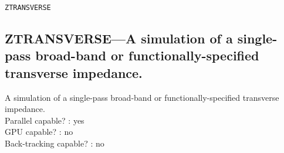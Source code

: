 \vspace*{0.5in}

\vspace*{0.5in}

\newpage
\begin{center}{\Large\verb|ZTRANSVERSE|}\end{center}
\subsection{ZTRANSVERSE---A simulation of a single-pass broad-band or functionally-specified transverse impedance.}
A simulation of a single-pass broad-band or functionally-specified transverse impedance.
\\
Parallel capable? : yes\\
GPU capable? : no\\
Back-tracking capable? : no\\
